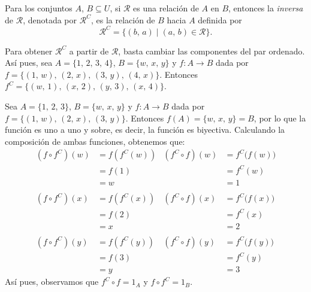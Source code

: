 \newpage

\begin{definicion}{}{}
    Para los conjuntos $A$, $B \subseteq U$, si $\mathcal{R}$ es una relación de $A$ en $B$, entonces la \textit{inversa} de $\mathcal{R}$, denotada por $\mathcal{R}^C$, es la relación de $B$ hacia $A$ definida por
    $$\mathcal{R}^C = \{ (b, \, a) \mid (a, \, b) \in \mathcal{R} \}.$$
\end{definicion}

\begin{BOX}
    Para obtener $\mathcal{R}^C$ a partir de $\mathcal{R}$, basta cambiar las componentes del par ordenado. Así pues, sea $A = \{ 1, \, 2, \, 3, \, 4 \}$, $B = \{ w, \, x, \, y \}$ y $f: A \longrightarrow B$ dada por $f = \{ (1, \, w), \, (2, \, x), \, (3, \, y), \, (4, \, x) \}$. Entonces $f^C = \{ (w, \, 1), \, (x, \, 2), \, (y, \, 3), \, (x, \, 4) \}$.
\end{BOX}

\begin{myexample}
    Sea $A = \{ 1, \, 2, \, 3 \}$, $B = \{ w, \, x, \, y \}$ y $f: A \longrightarrow B$ dada por $f = \{ (1, \, w), \, (2, \, x), \, (3, \, y) \}$. Entonces $f(A) = \{ w, \, x, \, y \} = B$, por lo que la función es uno a uno y sobre, es decir, la función es biyectiva. Calculando la composición de ambas funciones, obtenemos que:
    \begin{align*}
        \left(f \circ f^{C}\right)(w) & = f\left(f^{C}(w)\right) & \left(f^{C} \circ f\right)(w) & = f^{C}\big(f(w)\big) \\
        & = f(1) & & = f^{C}(w) \\
        & = w & & = 1 \\
        \\
        \left(f \circ f^{C}\right)(x) & = f\left(f^{C}(x)\right) & \left(f^{C} \circ f\right)(x) & = f^{C}\big(f(x)\big) \\
        & = f(2) & & = f^{C}(x) \\
        & = x & & = 2 \\
        \\
        \left(f \circ f^{C}\right)(y) & = f\left(f^{C}(y)\right) & \left(f^{C} \circ f\right)(y) & = f^{C}\big(f(y)\big) \\
        & = f(3) & & = f^{C}(y) \\
        & = y & & = 3
    \end{align*}
    Así pues, observamos que $f^{C} \circ f = 1_A$ y $f \circ f^{C} = 1_B$.
\end{myexample}

